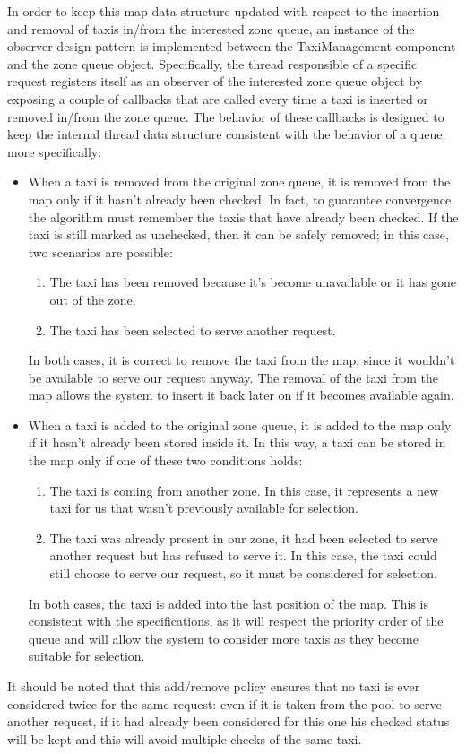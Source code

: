 In order to keep this map data structure updated with respect to the insertion and removal of taxis in/from the interested zone queue, an instance of the observer design pattern is implemented between the TaxiManagement component and the zone queue object. Specifically, the thread responsible of a specific request registers itself as an observer of the interested zone queue object by exposing a couple of callbacks that are called every time a taxi is inserted or removed in/from the zone queue. The behavior of these callbacks is designed to keep the internal thread data structure consistent with the behavior of a queue; more specifically:
\begin{itemize}
	\item When a taxi is removed from the original zone queue, it is removed from the map only if it hasn't already been checked. In fact, to guarantee convergence the algorithm must remember the taxis that have already been checked. If the taxi is still marked as unchecked, then it can be safely removed; in this case, two scenarios are possible:
	\begin{enumerate}
	\item The taxi has been removed because it's become unavailable or it has gone out of the zone. 
	\item The taxi has been selected to serve another request.	\end{enumerate}
	In both cases, it is correct to remove the taxi from the map, since it wouldn't be available to serve our request anyway. The removal of the taxi from the map allows the system to insert it back later on if it becomes available again.
	\item When a taxi is added to the original zone queue, it is added to the map only if it hasn't already been stored inside it. In this way, a taxi can be stored in the map only if one of these two conditions holds:
	\begin{enumerate}
		\item The taxi is coming from another zone. In this case, it represents a new taxi for us that wasn't previously available for selection. 
		\item The taxi was already present in our zone, it had been selected to serve another request but has refused to serve it. In this case, the taxi could still choose to serve our request, so it must be considered for selection. 
	\end{enumerate}
	In both cases, the taxi is added into the last position of the map. This is consistent with the specifications, as it will respect the priority order of the queue and will allow the system to consider more taxis as they become suitable for selection. 
\end{itemize}
It should be noted that this add/remove policy ensures that no taxi is ever considered twice for the same request: even if it is taken from the pool to serve another request, if it had already been considered for this one his checked status will be kept and this will avoid multiple checks of the same taxi.


